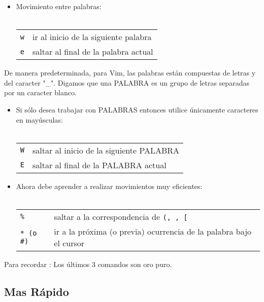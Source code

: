 \documentclass[12pt]{article}
\begin{document}
\begin{itemize}
	\item Movimiento entre palabras: \\ \\
\begin{tabular}{ l l }
	\texttt{w} & ir al inicio de la siguiente palabra \\
	\texttt{e} & saltar al final de la palabra actual \\
\end{tabular}
\end{itemize}



	De manera predeterminada, para Vim, las palabras están compuestas de letras y del caracter "\_". 
Digamos que una PALABRA es un grupo de letras separadas por un caracter blanco. 

\begin{itemize}
	\item Si sólo desea trabajar con PALABRAS entonces utilice únicamente caracteres en mayúsculas: \\ \\
\begin{tabular}{ l l }
	\texttt{W} & saltar al inicio de la siguiente PALABRA \\
	\texttt{E} & saltar al final de la PALABRA actual \\
\end{tabular}
\end{itemize}





	
\begin{itemize}
	\item Ahora debe aprender a realizar movimientos muy eficientes: \\ \\
\begin{tabular}{ l l }
	\texttt{\%} & saltar a la correspondencia de \texttt{(, {, [ } }  \\
        \texttt{* (o \#)} & ir a la próxima (o previa) ocurrencia de la palabra bajo el cursor \\
\end{tabular}
\end{itemize}


Para recordar : Los últimos 3 comandos son oro puro.

\subsection{Mas Rápido}
\end{document}
